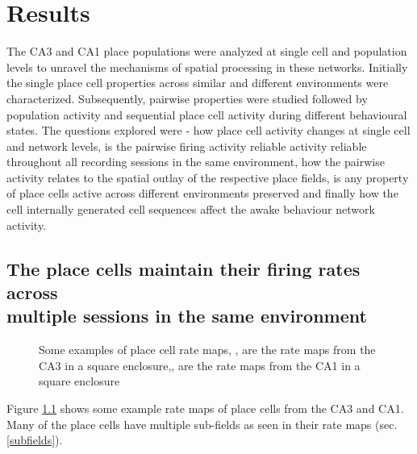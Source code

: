 \chapter{Results}
\label{results}

The CA3 and CA1 place populations were analyzed at single cell and population levels to unravel the mechanisms of spatial processing in these networks.  Initially the single place cell properties across similar and different environments were characterized. Subsequently, pairwise properties were studied followed by population activity and sequential place cell activity during different behavioural states. The questions explored were - how place cell activity changes at single cell and network levels, is the pairwise firing activity reliable activity reliable throughout all recording sessions in the same environment, how the pairwise activity relates to the spatial outlay of the respective place fields, is any property of place cells active across different environments preserved and finally how the cell internally generated cell sequences affect the awake behaviour network activity.  \\ 


\section[Place cell firing in same environment]{The place cells maintain their firing rates across \\ multiple sessions in the same environment}


\begin{figure}[htb!]
\centering
{}
\caption[Rate maps]{Some examples of place cell rate maps, ,  are the rate maps from the CA3 in a square enclosure,,  are the rate maps from the CA1 in a square enclosure}
\label{fig:rm}
\end{figure}
Figure \ref{fig:rm} shows some example rate maps of place cells from the CA3 and CA1. Many of the place cells have multiple sub-fields as seen in their rate maps (sec. \ref{subfields}). 

